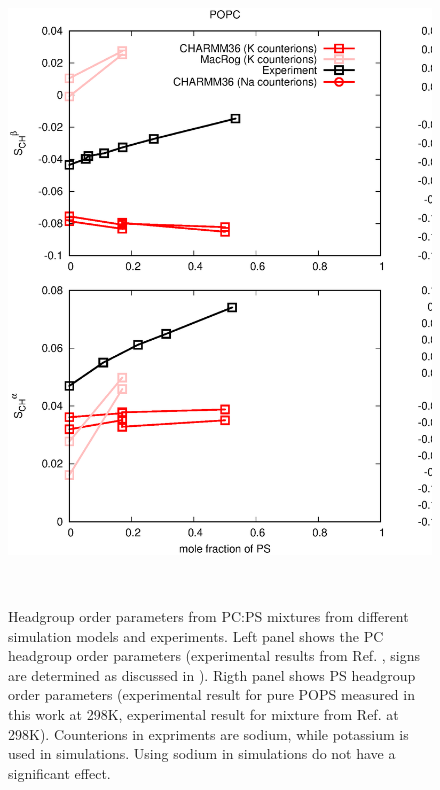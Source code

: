 \documentclass[aps,prl,superscriptaddress,twocolumn]{revtex4}
\begin{document}
\begin{figure}[]
  \centering
  \includegraphics[width=16.0cm]{../Figs/HGorderparametersPCvsPS.eps}
  \caption{\label{HGorderparametersPCvsPS}
    Headgroup order parameters from PC:PS mixtures from 
    different simulation models and experiments.
    Left panel shows the PC headgroup order parameters (experimental results from Ref. ,
    signs are determined as discussed in \cite{botan15,ollila16}).
    Rigth panel shows PS headgroup order parameters (experimental result for pure POPS measured in this
    work at 298K, experimental result for mixture from Ref.  at 298K).
    Counterions in expriments are sodium, while potassium is used in simulations.
    Using sodium in simulations do not have a significant effect.
  }
   \\
\end{figure}
\end{document}
